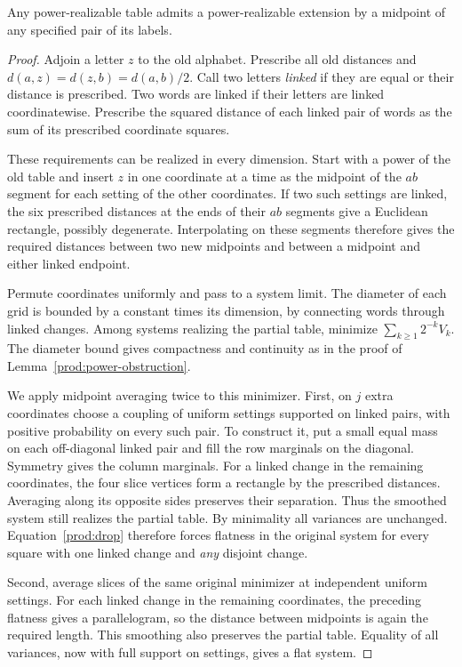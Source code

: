 \begin{lemma}\label{prod:midextend}
Any power-realizable table admits a power-realizable extension by a midpoint
of any specified pair of its labels.
\end{lemma}
\begin{proof}
Adjoin a letter $z$ to the old alphabet. Prescribe all old distances
and $d(a,z)=d(z,b)=d(a,b)/2$. Call two letters \emph{linked} if they
are equal or their distance is prescribed. Two words are linked if
their letters are linked coordinatewise. Prescribe the squared distance of each linked pair of words as the sum
of its prescribed coordinate squares.

These requirements can be realized in every dimension. Start with a
power of the old table and insert $z$ in one coordinate at a time as
the midpoint of the $ab$ segment for each setting of the other
coordinates. If two such settings are linked, the six prescribed
distances at the ends of their $ab$ segments give a Euclidean rectangle,
possibly degenerate. Interpolating on these segments therefore gives
the required distances between two new midpoints and between a midpoint
and either linked endpoint.

Permute coordinates uniformly and pass to a system limit. The diameter
of each grid is bounded by a constant times its dimension, by connecting
words through linked changes. Among systems realizing the partial table,
minimize $\sum_{k\ge1}2^{-k}V_k$. The diameter bound gives compactness
and continuity as in the proof of Lemma~\ref{prod:power-obstruction}.

We apply midpoint averaging twice to this minimizer. First, on $j$
extra coordinates choose a coupling of uniform settings supported on
linked pairs, with positive probability on every such pair. To construct
it, put a small equal mass on each off-diagonal linked pair and fill
the row marginals on the diagonal. Symmetry gives the column marginals.
For a linked change in the remaining coordinates, the four slice
vertices form a rectangle by the prescribed distances. Averaging
along its opposite sides preserves their separation. Thus the smoothed
system still realizes the partial table. By minimality all variances are unchanged. Equation~\eqref{prod:drop}
therefore forces flatness in the original system for every square with
one linked change and \emph{any} disjoint change.

Second, average slices of the same original minimizer at independent
uniform settings. For each linked change in the remaining coordinates,
the preceding flatness gives a parallelogram, so the distance between
midpoints is again the required length. This smoothing also preserves
the partial table. Equality of all variances, now with full support
on settings, gives a flat system.


\end{proof}
